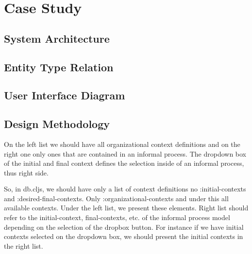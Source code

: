\chapter{Case Study}
\label{chap:casestudy}


\section{System Architecture}
\label{sec:sysarch}


\section{Entity Type Relation}
\label{sec:enttyperelation}


\section{User Interface Diagram}
\label{sec:uidiagram}

\section{Design Methodology}
\label{sec:designmethodology}

On the left list we should have all organizational context definitions and on the right one only ones that are contained in an informal process. The dropdown box of the initial and final context defines the selection inside of an informal process, thus right side.

So, in db.cljs, we should have only a list of context definitions no :initial-contexts and :desired-final-contexts. Only :organizational-contexts and under this all available contexts. Under the left list, we present these elements. Right list should refer to the initial-context, final-contexts, etc. of the informal process model depending on the selection of the dropbox button. For instance if we have initial contexts selected on the dropdown box, we should present the initial contexts in the right list.

